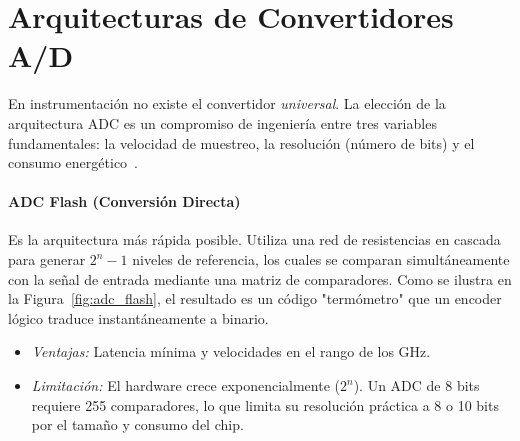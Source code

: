 
\section{Arquitecturas de Convertidores A/D}\label{sec:arquitecturas_adc}

En instrumentación no existe el convertidor \emph{universal}. La elección de la arquitectura ADC es un compromiso de ingeniería entre tres variables fundamentales: la velocidad de muestreo, la resolución (número de bits) y el consumo energético~\cite{kester2005dataconversion}.

\paragraph{ADC Flash (Conversión Directa)}
Es la arquitectura más rápida posible. Utiliza una red de resistencias en cascada para generar $2^n - 1$ niveles de referencia, los cuales se comparan simultáneamente con la señal de entrada mediante una matriz de comparadores. Como se ilustra en la Figura~\ref{fig:adc_flash}, el resultado es un código "termómetro" que un encoder lógico traduce instantáneamente a binario.
\begin{itemize}
    \item \emph{Ventajas:} Latencia mínima y velocidades en el rango de los \unit{GHz}.
    \item \emph{Limitación:} El hardware crece exponencialmente ($2^n$). Un ADC de 8 bits requiere 255 comparadores, lo que limita su resolución práctica a 8 o 10 bits por el tamaño y consumo del chip.
\end{itemize}

